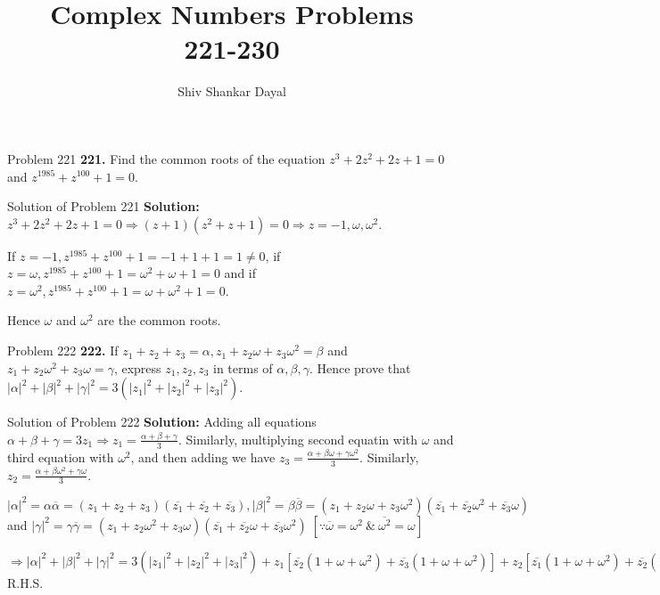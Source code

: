 \documentclass[aspectratio=169,8pt]{beamer}
\title{Complex Numbers Problems\\ 221-230}
\author[Shiv Shankar Dayal]{Shiv Shankar Dayal}
\begin{document}
\begin{frame}
  \titlepage
\end{frame}
\begin{frame}{Problem 221}
  \textbf{221.} Find the common roots of the equation $z^3 + 2z^2 + 2z + 1 = 0$ and $z^{1985} + z^{100} + 1
  = 0$.
\end{frame}
\begin{frame}{Solution of Problem 221}
  \textbf{Solution:} $z^3 + 2z^2 + 2z + 1 = 0 \Rightarrow (z + 1)(z^2 + z + 1) = 0\Rightarrow z = -1,
  \omega,\omega^2$.

  If $z = -1, z^{1985} + z^{100} + 1 = -1 + 1 + 1 = 1\neq 0$, if $z = \omega, z^{1985} + z^{100} + 1 =
  \omega^2 + \omega + 1 = 0$ and if $z = \omega^2, z^{1985} + z^{100} + 1 = \omega + \omega^2 + 1 = 0$.

  Hence $\omega$ and $\omega^2$ are the common roots.
\end{frame}
\begin{frame}{Problem 222}
  \textbf{222.} If $z_1 + z_2 + z_3 = \alpha, z_1 + z_2\omega + z_3\omega^2 = \beta$ and $z_1 + z_2\omega^2 +
  z_3\omega = \gamma$, express $z_1, z_2, z_3$ in terms of $\alpha, \beta, \gamma$. Hence prove that
  $|\alpha|^2 + |\beta|^2 + |\gamma|^2 = 3(|z_1|^2 + |z_2|^2 + |z_3|^2)$.
\end{frame}
\begin{frame}{Solution of Problem 222}
  \textbf{Solution:} Adding all equations $\alpha + \beta + \gamma = 3z_1 \Rightarrow z_1 = \frac{\alpha + \beta +
    \gamma}{3}$. Similarly, multiplying second equatin with $\omega$ and third equation with $\omega^2$, and
  then adding we have $z_3 = \frac{\alpha + \beta\omega + \gamma\omega^2}{3}$. Similarly, $z_2 =
  \frac{\alpha + \beta\omega^2 + \gamma\omega}{3}$.

  $|\alpha|^2 = \alpha\overline{\alpha} = (z_1 + z_2 + z_3)(\overline{z_1} + \overline{z_2} +
  \overline{z_3}), |\beta|^2 = \beta\overline{\beta} = (z_1 + z_2\omega + z_3\omega^2)(\overline{z_1} +
  \overline{z_2}\omega^2 + \overline{z_3}\omega)$ and $|\gamma|^2 = \gamma\overline{\gamma} = (z_1 +
  z_2\omega^2 + z_3\omega)(\overline{z_1} + \overline{z_2}\omega + \overline{z_3}\omega^2)\;[\because
  \overline{\omega} = \omega^2\ \&\ \overline{\omega^2} = \omega]$

  $\Rightarrow |\alpha|^2 + |\beta|^2 + |\gamma|^2 = 3(|z_1|^2 + |z_2|^2 + |z_3|^2) + z_1[\overline{z_2}(1 +
  \omega + \omega^2) + \overline{z_3}(1 + \omega + \omega^2)] + z_2[\overline{z_1}(1 + \omega + \omega^2)
  + \overline{z_2}(1 + \omega + \omega^2)] + z_3[\overline{z_1}(1 + \omega + \omega^2) + \overline{z_2}(1
  + \omega + \omega^2)] = 3(|z_1|^2 + |z_2|^2 + |z_3|^2) =$ R.H.S.
\end{frame}
\end{document}
